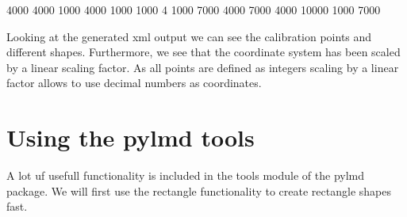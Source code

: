 \documentclass[a4paper,10pt,english,openany,oneside]{sphinxmanual}
\begin{document}
\begin{sphinxVerbatim}[commandchars=\\\{\}]
    4000
    4000
    1000
    4000
    1000
    1000
    4
    1000
    7000
    4000
    7000
    4000
    10000
    1000
    7000
\end{sphinxVerbatim}

\sphinxAtStartPar
Looking at the generated xml output we can see the calibration points and different shapes. Furthermore, we see that the coordinate system has been scaled by a linear scaling factor. As all points are defined as integers scaling by a linear factor allows to use decimal numbers as coordinates.


\section{Using the py\sphinxhyphen{}lmd tools}
\label{\detokenize{pages/quickstart:using-the-py-lmd-tools}}
\sphinxAtStartPar
A lot uf usefull functionality is included in the tools module of the py\sphinxhyphen{}lmd package. We will first use the rectangle functionality to create rectangle shapes fast.
\end{document}
